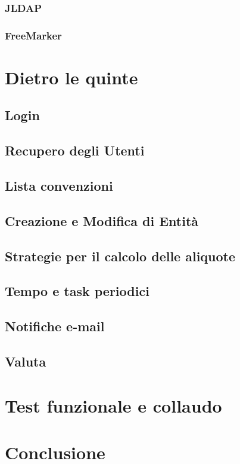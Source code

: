\documentclass[italian,laurea,twoside,10pt]{UFtesi}
\begin{document}
\subsection{JLDAP}
\label{jldap}

\subsection{FreeMarker}
\label{freemarker}



\chapter{Dietro le quinte}
\label{code}

\section{Login}
\label{login}

\section{Recupero degli Utenti}

\section{Lista convenzioni}


\section{Creazione e Modifica di Entità}


\section{Strategie per il calcolo delle aliquote}

\section{Tempo e task periodici}

\section{Notifiche e-mail}

\section{Valuta}



\chapter{Test funzionale e collaudo}
\label{howto}


\chapter{Conclusione}


\nocite{*}		 %
{}

\end{document}
